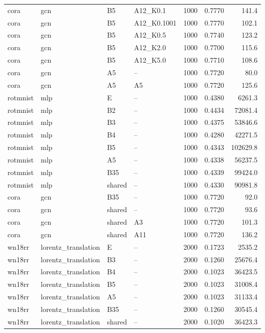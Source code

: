 \begin{longtable}{llllrrr}
\rowcolor{oursbg}
cora & gcn & B5 & A12\_K0.1 & 1000 & 0.7770 & 141.4 \\
\rowcolor{oursbg}
cora & gcn & B5 & A12\_K0.1001 & 1000 & 0.7770 & 102.1 \\
\rowcolor{oursbg}
cora & gcn & B5 & A12\_K0.5 & 1000 & 0.7740 & 123.2 \\
\rowcolor{oursbg}
cora & gcn & B5 & A12\_K2.0 & 1000 & 0.7700 & 115.6 \\
\rowcolor{oursbg}
cora & gcn & B5 & A12\_K5.0 & 1000 & 0.7710 & 108.6 \\
cora & gcn & A5 & -- & 1000 & 0.7720 & 80.0 \\
cora & gcn & A5 & A5 & 1000 & 0.7720 & 125.6 \\
rotmnist & mlp & E & -- & 1000 & 0.4380 & 6261.3 \\
rotmnist & mlp & B2 & -- & 1000 & 0.4434 & 72081.4 \\
rotmnist & mlp & B3 & -- & 1000 & 0.4375 & 53846.6 \\
rotmnist & mlp & B4 & -- & 1000 & 0.4280 & 42271.5 \\
\rowcolor{oursbg}
rotmnist & mlp & B5 & -- & 1000 & 0.4343 & 102629.8 \\
rotmnist & mlp & A5 & -- & 1000 & 0.4338 & 56237.5 \\
rotmnist & mlp & B35 & -- & 1000 & 0.4339 & 99424.0 \\
rotmnist & mlp & shared & -- & 1000 & 0.4330 & 90981.8 \\
cora & gcn & B35 & -- & 1000 & 0.7720 & 92.0 \\
cora & gcn & shared & -- & 1000 & 0.7720 & 93.6 \\
cora & gcn & shared & A3 & 1000 & 0.7720 & 101.3 \\
cora & gcn & shared & A11 & 1000 & 0.7720 & 136.2 \\
wn18rr & lorentz\_translation & E & -- & 2000 & 0.1723 & 2535.2 \\
wn18rr & lorentz\_translation & B3 & -- & 2000 & 0.1260 & 25676.4 \\
wn18rr & lorentz\_translation & B4 & -- & 2000 & 0.1023 & 36423.5 \\
\rowcolor{oursbg}
wn18rr & lorentz\_translation & B5 & -- & 2000 & 0.1023 & 31008.4 \\
wn18rr & lorentz\_translation & A5 & -- & 2000 & 0.1023 & 31133.4 \\
wn18rr & lorentz\_translation & B35 & -- & 2000 & 0.1260 & 30545.4 \\
wn18rr & lorentz\_translation & shared & -- & 2000 & 0.1020 & 36423.3 \\

\end{longtable}
